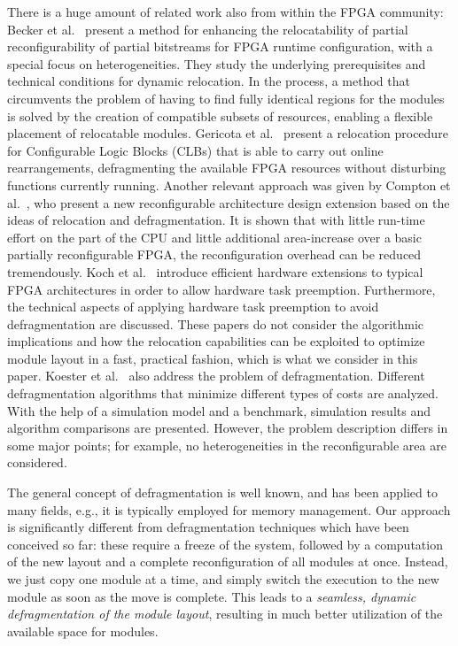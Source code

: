 \documentclass{article}
\begin{document}
There is a huge amount of related work also from within the FPGA
community: Becker et al.~\cite{blc-erpbr-07} present a method for
enhancing the relocatability of partial reconfigurability of partial
bitstreams for FPGA runtime configuration, with a special focus on
heterogeneities. They study the underlying prerequisites and
technical conditions for dynamic relocation. In the process, a method that
circumvents the problem of having to find fully identical regions for
the modules is solved by the creation of compatible subsets of
resources, enabling a flexible placement of relocatable modules.
Gericota et al.~\cite{gericota05} present a relocation procedure for
Configurable Logic Blocks (CLBs) that is able to carry out online
rearrangements, defragmenting the available FPGA resources without
disturbing functions currently running. Another relevant approach was
given by Compton et al.~\cite{clckh-crdrt-02}, who present a new
reconfigurable architecture design extension based on the ideas of
relocation and defragmentation. It is shown that with
little run-time effort on the part of the CPU and little additional
area-increase over a basic partially reconfigurable FPGA, the
reconfiguration overhead can be reduced tremendously. Koch et
al.~\cite{kabk-faepm-04} introduce efficient hardware extensions to
typical FPGA architectures in order to allow hardware task
preemption. Furthermore, the technical aspects of applying 
hardware task preemption to avoid defragmentation are discussed.
These papers do not consider the algorithmic implications and how the
relocation capabilities can be exploited
to optimize module layout in a fast, practical fashion, which is what we consider in this paper. Koester et
al.~\cite{koester07} also address the problem of
defragmentation. Different defragmentation algorithms that minimize
different types of costs are analyzed. With the help of a simulation
model and a benchmark, simulation results and algorithm comparisons
are presented. However, the problem description differs in some major points;
for example, no heterogeneities in the reconfigurable area are considered.

The general concept of defragmentation is well known, and has been applied to
many fields, e.g., it is typically employed for memory management. Our approach
is significantly different from defragmentation techniques which have been
conceived so far: these require a freeze of the system, followed by
a computation of the new layout and a complete reconfiguration of all modules
at once.  Instead, we just copy one module 
at a time, and simply switch the execution to the new module as soon as the move is complete.
This leads to a {\em seamless, dynamic defragmentation
of the module layout}, resulting in much better
utilization of the available space for modules.
\end{document}
